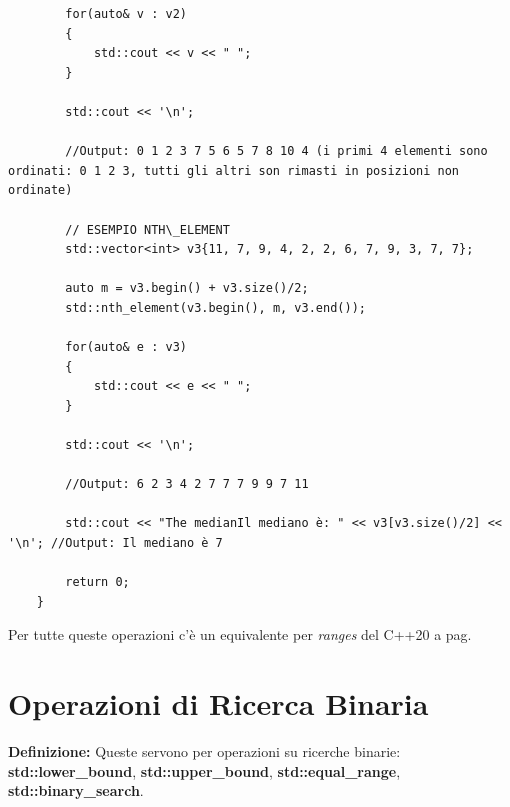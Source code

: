 \begin{lstlisting}
		for(auto& v : v2)
		{
			std::cout << v << " ";
		}
	
		std::cout << '\n';
		
		//Output: 0 1 2 3 7 5 6 5 7 8 10 4 (i primi 4 elementi sono ordinati: 0 1 2 3, tutti gli altri son rimasti in posizioni non ordinate)
		
		// ESEMPIO NTH\_ELEMENT
		std::vector<int> v3{11, 7, 9, 4, 2, 2, 6, 7, 9, 3, 7, 7};
		
		auto m = v3.begin() + v3.size()/2;
		std::nth_element(v3.begin(), m, v3.end());
		
		for(auto& e : v3)
		{
			std::cout << e << " ";
		}
		
		std::cout << '\n';
		
		//Output: 6 2 3 4 2 7 7 7 9 9 7 11
		
		std::cout << "The medianIl mediano è: " << v3[v3.size()/2] << '\n'; //Output: Il mediano è 7
		
		return 0;
	}
\end{lstlisting}

\fleuron

\textsf{\small Per tutte queste operazioni c'è un equivalente per \emph{ranges} del C++20 a pag. \pageref{ranges_sorting}} \\


\newpage

\section{Operazioni di Ricerca Binaria}

\textsf{\small \textbf{Definizione: } Queste servono per operazioni su ricerche binarie: \textbf{std::lower\_bound}, \textbf{std::upper\_bound}, \textbf{std::equal\_range}, \textbf{std::binary\_search}.} \\

